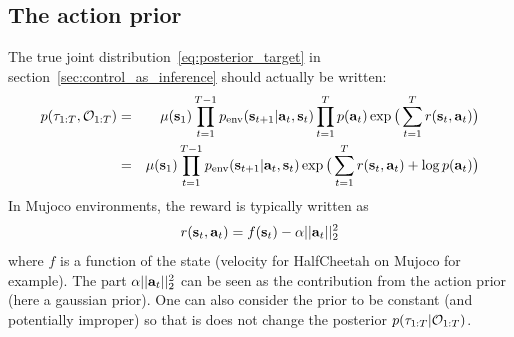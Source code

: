 \subsection{The action prior}
\label{app:action_prior}

The true joint distribution~\ref{eq:posterior_target} in section~\ref{sec:control_as_inference} should actually be written:
\begin{eqnarray*}
\label{eq:true_posterior_target}
p(\tau_{1:T}, {\mathcal{O}}_{1:T}) &=& \mu({\mathbf{s}}_1) \prod_{t=1}^{T-1} p_{\text{env}}({\mathbf{s}}_{t+1}|{\mathbf{a}}_t, {\mathbf{s}}_t) \prod_{t=1}^{T} p({\mathbf{a}}_t) \exp\big(\sum_{t=1}^{T} r({\mathbf{s}}_t, {\mathbf{a}}_t)\big) \\
&=& \mu({\mathbf{s}}_1) \prod_{t=1}^{T-1} p_{\text{env}}({\mathbf{s}}_{t+1}|{\mathbf{a}}_t, {\mathbf{s}}_t)\exp\big(\sum_{t=1}^{T} r({\mathbf{s}}_t, {\mathbf{a}}_t) + \log p({\mathbf{a}}_t)\big) \\
\end{eqnarray*}
In Mujoco environments, the reward is typically written as 
$$r({\mathbf{s}}_t, {\mathbf{a}}_t) = f({\mathbf{s}}_t) - \alpha ||{\mathbf{a}}_t||_2^2 $$
where $f$ is a function of the state (velocity for HalfCheetah on Mujoco for example). The part $\alpha ||{\mathbf{a}}_t||_2^2$ can be seen as the contribution from the action prior (here a gaussian prior).
One can also consider the prior to be constant (and potentially improper) so that is does not change the posterior $p(\tau_{1:T}| {\mathcal{O}}_{1:T})$.



